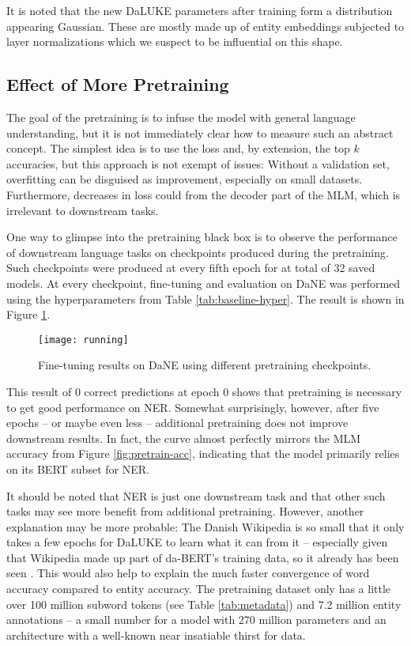 \documentclass[main.tex]{subfiles}
\begin{document}
It is noted that the new DaLUKE parameters after training form a distribution appearing Gaussian.
These are mostly made up of entity embeddings subjected to layer normalizations which we suspect to be influential on this shape.

\subsection{Effect of More Pretraining}
\label{subsec:effmore}
The goal of the pretraining is to infuse the model with general language understanding, but it is not immediately clear how to measure such an abstract concept.
The simplest idea is to use the loss and, by extension, the top $ k $ accuracies, but this approach is not exempt of issues:
Without a validation set, overfitting can be disguised as improvement, especially on small datasets.
Furthermore, decreases in loss could from the decoder part of the MLM, which is irrelevant to downstream tasks.

One way to glimpse into the pretraining black box is to observe the performance of downstream language tasks on checkpoints produced during the pretraining.
Such checkpoints were produced at every fifth epoch for at total of 32 saved models.
At every checkpoint, fine-tuning and evaluation on DaNE was performed using the hyperparameters from Table \ref{tab:baseline-hyper}.
The result is shown in Figure \ref{fig:running}.
\begin{figure}[H]
    \centering
    \texttt{[image: running]}
    \caption{Fine-tuning results on DaNE using different pretraining checkpoints.}
    \label{fig:running}
\end{figure}\noindent
This result of 0 correct predictions at epoch 0 shows that pretraining is necessary to get good performance on NER.
Somewhat surprisingly, however, after five epochs -- or maybe even less -- additional pretraining does not improve downstream results.
In fact, the curve almost perfectly mirrors the MLM accuracy from Figure \ref{fig:pretrain-acc}, indicating that the model primarily relies on its BERT subset for NER.

It should be noted that NER is just one downstream task and that other such tasks may see more benefit from additional pretraining.
However, another explanation may be more probable:
The Danish Wikipedia is so small that it only takes a few epochs for DaLUKE to learn what it can from it -- especially given that Wikipedia made up part of da-BERT's training data, so it already has been seen \cite{botxo2019dabert}.
This would also help to explain the much faster convergence of word accuracy compared to entity accuracy.
The pretraining dataset only has a little over 100 million subword tokens (see Table \ref{tab:metadata}) and 7.2 million entity annotations -- a small number for a model with 270 million parameters and an architecture with a well-known near insatiable thirst for data.
\end{document}
